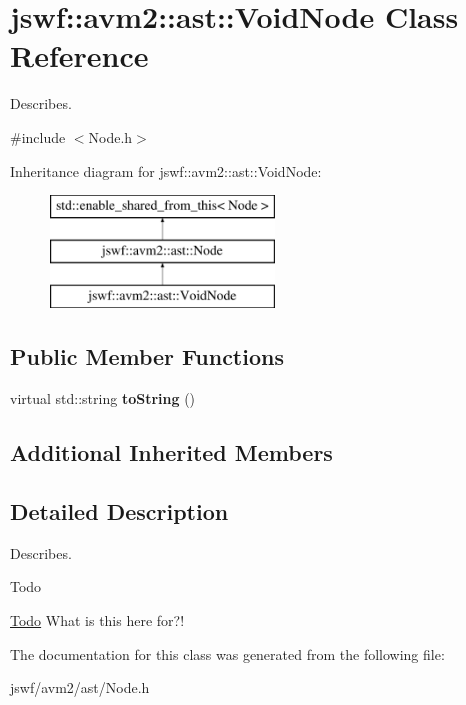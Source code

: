 \hypertarget{classjswf_1_1avm2_1_1ast_1_1_void_node}{\section{jswf\+:\+:avm2\+:\+:ast\+:\+:Void\+Node Class Reference}
\label{classjswf_1_1avm2_1_1ast_1_1_void_node}
}


Describes.  




{\ttfamily \#include $<$Node.\+h$>$}

Inheritance diagram for jswf\+:\+:avm2\+:\+:ast\+:\+:Void\+Node\+:\begin{figure}[H]
\begin{center}
\leavevmode
\includegraphics[height=3.000000cm]{classjswf_1_1avm2_1_1ast_1_1_void_node}
\end{center}
\end{figure}
\subsection*{Public Member Functions}
\begin{DoxyCompactItemize}
\item 
\hypertarget{classjswf_1_1avm2_1_1ast_1_1_void_node_ae5034ace29e48e322c8147103593ae76}{virtual std\+::string {\bfseries to\+String} ()}\label{classjswf_1_1avm2_1_1ast_1_1_void_node_ae5034ace29e48e322c8147103593ae76}

\end{DoxyCompactItemize}
\subsection*{Additional Inherited Members}


\subsection{Detailed Description}
Describes. 

\begin{DoxyRefDesc}{Todo}
\item[\hyperlink{todo__todo000001}{Todo}]What is this here for?! \end{DoxyRefDesc}


The documentation for this class was generated from the following file\+:\begin{DoxyCompactItemize}
\item 
jswf/avm2/ast/Node.\+h\end{DoxyCompactItemize}
